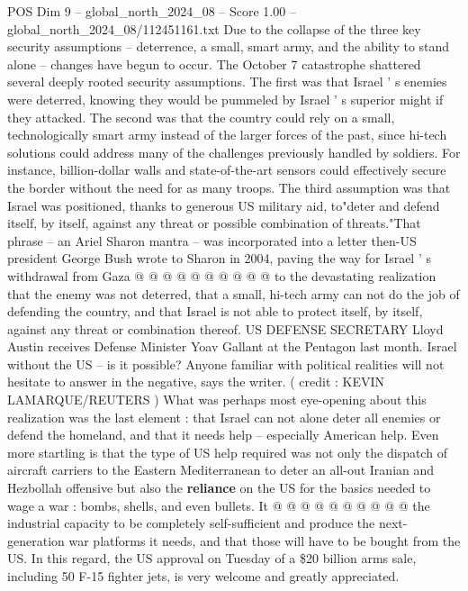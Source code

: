 \begin{textsample}{POS Dim 9 – global\_north\_2024\_08 – Score 1.00 – global\_north\_2024\_08/112451161.txt}  \label{ex:f9_pos_364}
Due to the collapse of the three key security assumptions -- deterrence, a small, smart army, and the ability to stand alone -- changes have begun to occur.
The October 7 catastrophe shattered several deeply rooted security assumptions.
The first was that Israel ' s enemies were deterred, knowing they would be pummeled by Israel ' s superior might if they attacked.
The second was that the country could rely on a small, technologically smart army instead of the larger forces of the past, since hi-tech solutions could address many of the challenges previously handled by soldiers.
For instance, billion-dollar walls and state-of-the-art sensors could effectively secure the border without the need for as many troops.
The third assumption was that Israel was positioned, thanks to generous US military aid, to"deter and defend itself, by itself, against any threat or possible combination of threats."That phrase -- an Ariel Sharon mantra -- was incorporated into a letter then-US president George Bush wrote to Sharon in 2004, paving the way for Israel ' s withdrawal from Gaza @ @ @ @ @ @ @ @ @ @ to the devastating realization that the enemy was not deterred, that a small, hi-tech army can not do the job of defending the country, and that Israel is not able to protect itself, by itself, against any threat or combination thereof.
US DEFENSE SECRETARY Lloyd Austin receives Defense Minister Yoav Gallant at the Pentagon last month.
Israel without the US -- is it possible?
Anyone familiar with political realities will not hesitate to answer in the negative, says the writer. ( credit : KEVIN LAMARQUE/REUTERS ) What was perhaps most eye-opening about this realization was the last element : that Israel can not alone deter all enemies or defend the homeland, and that it needs help -- especially American help.
Even more startling is that the type of US help required was not only the dispatch of aircraft carriers to the Eastern Mediterranean to deter an all-out Iranian and Hezbollah offensive but also the \textbf{reliance} on the US for the basics needed to wage a war : bombs, shells, and even bullets.
It @ @ @ @ @ @ @ @ @ @ the industrial capacity to be completely self-sufficient and produce the next-generation war platforms it needs, and that those will have to be bought from the US.
In this regard, the US approval on Tuesday of a \$20 billion arms sale, including 50 F-15 fighter jets, is very welcome and greatly appreciated.

\end{textsample}
